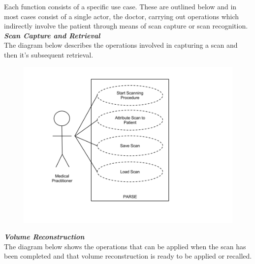 Each function consists of a specific use case. These are outlined below and in most cases consist of a single actor, the doctor, carrying out operations which indirectly involve the patient through means of scan capture or scan recognition. \\

\emph{\bf{Scan Capture and Retrieval}}\\

The diagram below describes the operations involved in capturing a scan and then it's subsequent retrieval.\\

\begin{figure}[!h]
\begin{center}
    \includegraphics[scale=0.25]{images/uml1.png}
\end{center}
\end{figure}

\pagebreak

\emph{\bf{Volume Reconstruction}}\\

The diagram below shows the operations that can be applied when the scan has been completed and that volume reconstruction is ready to be applied or recalled.\\

